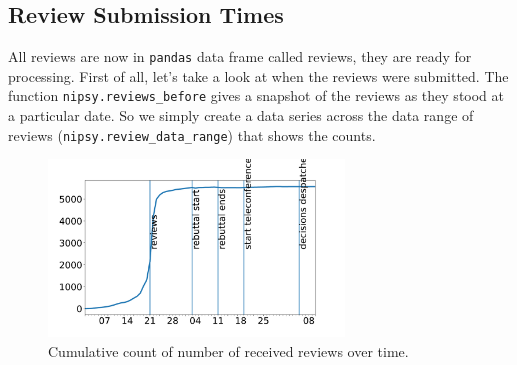 \begin{Shaded}
\begin{Highlighting}[]
\OperatorTok{=}
\end{Highlighting}
\end{Shaded}

\hypertarget{review-submission-times}{%
\subsection{Review Submission Times}\label{review-submission-times}}

All reviews are now in \texttt{pandas} data frame called reviews, they
are ready for processing. First of all, let's take a look at when the
reviews were submitted. The function \texttt{nipsy.reviews\_before}
gives a snapshot of the reviews as they stood at a particular date. So
we simply create a data series across the data range of reviews
(\texttt{nipsy.review\_data\_range}) that shows the counts.

\begin{Shaded}
\begin{Highlighting}[]
\OperatorTok{=}\OperatorTok{=}
\OperatorTok{=}\NormalTok{ nipsy.reviews\_before(reviews, date).Quality.shape[}\NormalTok{]}
\end{Highlighting}
\end{Shaded}

\begin{figure}[htb]
\includegraphics[width=0.70\textwidth]{diagrams/neurips/review-count.pdf}


\caption{Cumulative count of number of received reviews over time.}
\label{review-count}
\end{figure}

